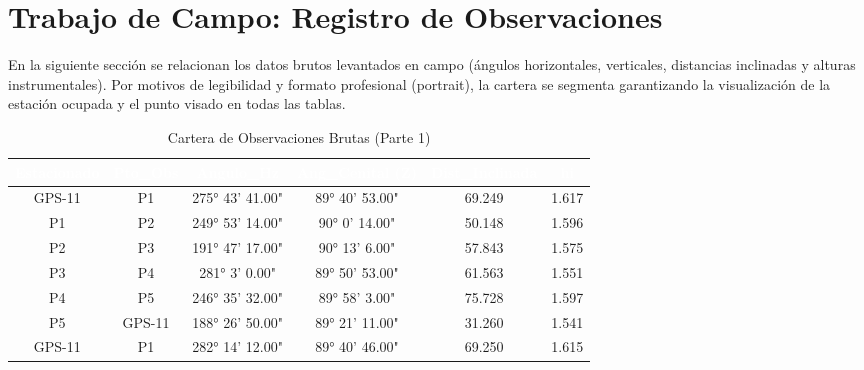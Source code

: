 \documentclass[11pt,letterpaper]{article}
\begin{document}
\section{Trabajo de Campo: Registro de Observaciones}
En la siguiente sección se relacionan los datos brutos levantados en campo (ángulos horizontales, verticales, distancias inclinadas y alturas instrumentales). Por motivos de legibilidad y formato profesional (portrait), la cartera se segmenta garantizando la visualización de la estación ocupada y el punto visado en todas las tablas.
\begin{table}[H]
  \centering
  \small
  \caption{Cartera de Observaciones Brutas (Parte 1)}
  \label{tab:campo_0}
  \begin{tabular}{|c|c|c|c|c|c|}
    \hline
    \rowcolor{GeoBlue}
    \textcolor{white}{\textbf{Estacionado}} & \textcolor{white}{\textbf{Pto\_Obs}} & \textcolor{white}{\textbf{Angulo\_Hz}} & \textcolor{white}{\textbf{Ang\_Cenital (Z)}} & \textcolor{white}{\textbf{Dist\_Inclinada}} & \textcolor{white}{\textbf{hi}} \\
    \hline
    \rowcolor{GeoBlue!5}
    GPS-11 & P1 & 275° 43' 41.00" & 89° 40' 53.00" & 69.249 & 1.617 \\
    \hline
    \rowcolor{white}
    P1 & P2 & 249° 53' 14.00" & 90° 0' 14.00" & 50.148 & 1.596 \\
    \hline
    \rowcolor{GeoBlue!5}
    P2 & P3 & 191° 47' 17.00" & 90° 13' 6.00" & 57.843 & 1.575 \\
    \hline
    \rowcolor{white}
    P3 & P4 & 281° 3' 0.00" & 89° 50' 53.00" & 61.563 & 1.551 \\
    \hline
    \rowcolor{GeoBlue!5}
    P4 & P5 & 246° 35' 32.00" & 89° 58' 3.00" & 75.728 & 1.597 \\
    \hline
    \rowcolor{white}
    P5 & GPS-11 & 188° 26' 50.00" & 89° 21' 11.00" & 31.260 & 1.541 \\
    \hline
    \rowcolor{GeoBlue!5}
    GPS-11 & P1 & 282° 14' 12.00" & 89° 40' 46.00" & 69.250 & 1.615 \\
    \hline
  \end{tabular}
\end{table}
\vspace{0.8cm}
\end{document}

